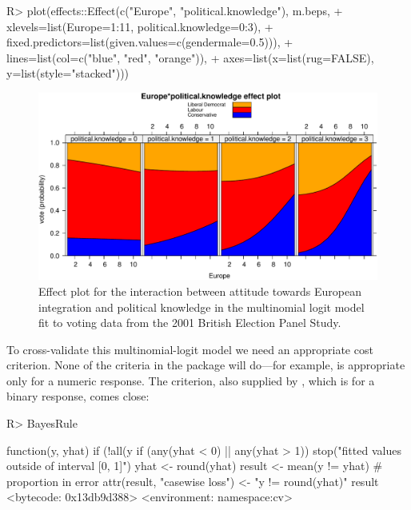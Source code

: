 \documentclass[
]{jss}
\begin{document}
\begin{CodeChunk}
\begin{CodeInput}
R> plot(effects::Effect(c("Europe", "political.knowledge"), m.beps,
+             xlevels=list(Europe=1:11, political.knowledge=0:3),
+             fixed.predictors=list(given.values=c(gendermale=0.5))),
+      lines=list(col=c("blue", "red", "orange")),
+      axes=list(x=list(rug=FALSE), y=list(style="stacked")))
\end{CodeInput}
\begin{figure}

{\centering \includegraphics{JSS-article-reduced_files/figure-latex/BEPS-plot-1} 

}

\caption[Effect plot for the interaction between attitude towards European integration and political knowledge in the multinomial logit model fit to voting data from the 2001 British Election Panel Study]{Effect plot for the interaction between attitude towards European integration and political knowledge in the multinomial logit model fit to voting data from the 2001 British Election Panel Study.}\label{fig:BEPS-plot}
\end{figure}
\end{CodeChunk}

To cross-validate this multinomial-logit model we need an appropriate
cost criterion. None of the criteria in the  package will
do---for example,  is appropriate only for a numeric
response. The  criterion, also supplied by ,
which is for a binary response, comes close:

\begin{CodeChunk}
\begin{CodeInput}
R> BayesRule
\end{CodeInput}
\begin{CodeOutput}
function(y, yhat){
  if (!all(y %
  if (any(yhat < 0) || any(yhat > 1)) stop("fitted values outside of interval [0, 1]")
  yhat <- round(yhat)
  result <- mean(y != yhat) # proportion in error
  attr(result, "casewise loss") <- "y != round(yhat)"
  result
}
<bytecode: 0x13db9d388>
<environment: namespace:cv>
\end{CodeOutput}
\end{CodeChunk}
\end{document}
